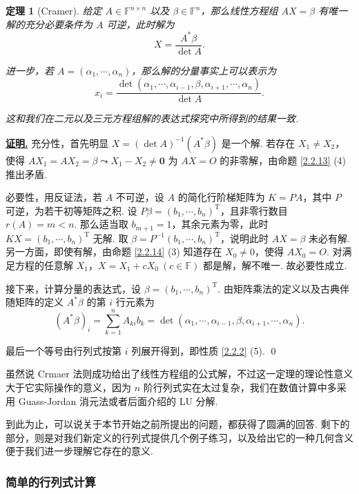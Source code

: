 \documentclass[10pt,openany]{article}
\theoremstyle{thmstyle} %
\newtheorem{theorem}{定理}[subsection]
\theoremstyle{defstyle} %
\theoremstyle{prostyle} %
\theoremstyle{exastyle}
\theoremstyle{remstyle}
\renewenvironment{proof}[1][证明]{\par\underline{\textbf{#1.}} \;\fangsong}{\qed\par}
\newcommand{\T}{^{\text{T}}}
\newcommand{\F}{\mathbb{F}}
\newcommand{\n}{^{n \times n}}
\begin{document}
\begin{theorem}[Cramer]\label{2.2.15}
	给定 \( A \in \F\n \) 以及 \( \beta \in \F^n \)，那么线性方程组 \( AX=\beta \) 有唯一解的充分必要条件为 \( A \) 可逆，此时解为
	\[ X=\frac{A^*\beta}{\det A}. \]
	
	进一步，若 \( A=(\alpha_1,\cdots,\alpha_n) \)，那么解的分量事实上可以表示为
	\[ x_i=\frac{\det(\alpha_1,\cdots,\alpha_{i-1},\beta,\alpha_{i+1},\cdots,\alpha_n)}{\det A}. \]
	
	这和我们在二元以及三元方程组解的表达式探究中所得到的结果一致.
	
\end{theorem}

\begin{proof}
	充分性，首先明显 \( X=(\det A)^{-1}(A^*\beta) \) 是一个解. 若存在 \( X_1 \neq X_2 \)，使得 \( AX_1=AX_2=\beta \leadsto X_1-X_2 \neq \bm{0} \) 为 \( AX=O \) 的非零解，由命题 \ref{2.2.13} (4) 推出矛盾. 
	
	必要性，用反证法，若 \( A \) 不可逆，设 \( A \) 的简化行阶梯矩阵为 \( K=PA \)，其中 \( P \) 可逆，为若干初等矩阵之积. 设 \( P\beta=(b_1,\cdots,b_n)\T \)，且非零行数目 \( r(A)=m<n \). 那么适当取 \( b_{m+1}=1 \)，其余元素为零，此时 \( KX=(b_1,\cdots,b_n)\T \) 无解. 取 \( \beta=P^{-1}(b_1,\cdots,b_n)\T \)，说明此时 \( AX=\beta \) 未必有解. 另一方面，即使有解，由命题 \ref{2.2.14} (3) 知道存在 \( X_0 \neq 0 \)，使得 \( AX_0=O \). 对满足方程的任意解 \( X_1 \)，\( X=X_1+cX_0 \ (c \in \F) \) 都是解，解不唯一. 故必要性成立.
	
	接下来，计算分量的表达式，设 \( \beta=(b_1,\cdots,b_n)\T \). 由矩阵乘法的定义以及古典伴随矩阵的定义 \( A^*\beta \) 的第 \( i \) 行元素为
	\[ (A^*\beta)_i=\sum_{k=1}^{n} A_{ki}b_k=\det(\alpha_1,\cdots,\alpha_{i-1},\beta,\alpha_{i+1},\cdots,\alpha_n). \]
	
	最后一个等号由行列式按第 \( i \) 列展开得到，即性质 \ref{2.2.2} (5).
\end{proof}

虽然说 Crmaer 法则成功给出了线性方程组的公式解，不过这一定理的理论性意义大于它实际操作的意义，因为 \( n \) 阶行列式实在太过复杂，我们在数值计算中多采用 Guass-Jordan 消元法或者后面介绍的 LU 分解.

到此为止，可以说关于本节开始之前所提出的问题，都获得了圆满的回答. 剩下的部分，则是对我们新定义的行列式提供几个例子练习，以及给出它的一种几何含义便于我们进一步理解它存在的意义.

\subsubsection{简单的行列式计算}
\end{document}
